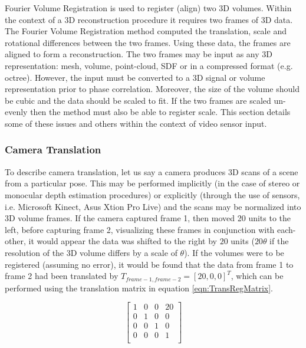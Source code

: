 Fourier Volume Registration is used to register (align) two 3D volumes. Within the context of a 3D reconstruction procedure it requires two frames of 3D data. The Fourier Volume Registration method computed the translation, scale and rotational differences between the two frames. Using these data, the frames are aligned to form a reconstruction. The two frames may be input as any 3D representation: mesh, volume, point-cloud, SDF or in a compressed format (e.g. octree). However, the input must be converted to a 3D signal or volume representation prior to phase correlation. Moreover, the size of the volume should be cubic and the data should be scaled to fit. If the two frames are scaled un-evenly then the method must also be able to register scale. This section details some of these issues and others within the context of video sensor input.  \\
 

\subsubsection{Camera Translation}
\label{sec:PCForSLAM}
To describe camera translation, let us say a camera produces 3D scans of a scene from a particular pose. This may be performed implicitly (in the case of stereo or monocular depth estimation procedures) or explicitly (through the use of sensors, i.e. Microsoft Kinect, Asus Xtion Pro Live) and the scans may be normalized into 3D volume frames. If the camera captured frame 1, then moved 20 units to the left, before capturing frame 2, visualizing these frames in conjunction with each-other, it would appear the data was shifted to the right by $20$ units ($20\theta$ if the resolution of the 3D volume differs by a scale of $\theta$). If the volumes were to be registered (assuming no error), it would be found that the data from frame 1 to frame 2 had been translated by $T_{frame-1,frame-2} = [20,0,0]^T$, which can be performed using the translation matrix in equation \ref{eqn:TransRegMatrix}.

\begin{equation} \label{eqn:TransRegMatrix}
\left[
\begin{array}{cccc}
1 & 0 & 0 & 20 \\
0 & 1 & 0 & 0 \\
0 & 0 & 1 & 0 \\
0 & 0 & 0 & 1 \\
\end{array}
\right]
\end{equation}

